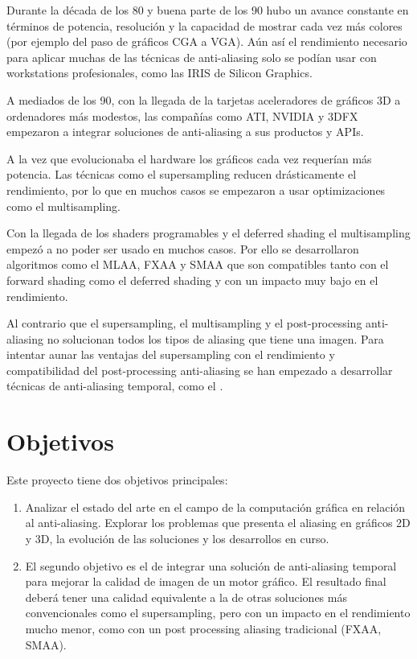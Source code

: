 \documentclass[withindex, glossary]{cam-thesis}
\begin{document}
Durante la década de los 80 y buena parte de los 90 hubo un avance constante en términos de potencia, resolución y la capacidad de mostrar cada vez más colores (por ejemplo del paso de gráficos CGA a VGA). Aún así el rendimiento necesario para aplicar muchas de las técnicas de anti-aliasing solo se podían usar con workstations profesionales, como las IRIS de Silicon Graphics.

A mediados de los 90, con la llegada de la tarjetas aceleradores de gráficos 3D a ordenadores más modestos, las compañías como ATI, NVIDIA y 3DFX empezaron a integrar soluciones de anti-aliasing a sus productos y APIs.

A la vez que evolucionaba el hardware los gráficos cada vez requerían más potencia. Las técnicas como el supersampling reducen drásticamente el rendimiento, por lo que en muchos casos se empezaron a usar optimizaciones como el multisampling.

Con la llegada de los shaders programables y el deferred shading el multisampling empezó a no poder ser usado en muchos casos. Por ello se desarrollaron algoritmos como el MLAA, FXAA y SMAA que son compatibles tanto con el forward shading como el deferred shading y con un impacto muy bajo en el rendimiento.

Al contrario que el supersampling, el multisampling y el post-processing anti-aliasing no solucionan todos los tipos de aliasing que tiene una imagen. Para intentar aunar las ventajas del supersampling con el rendimiento y compatibilidad del post-processing anti-aliasing se han empezado a desarrollar técnicas de anti-aliasing temporal, como el \@.

\chapter{Objetivos}

Este proyecto tiene dos objetivos principales:

\begin{enumerate}
    \item Analizar el estado del arte en el campo de la computación gráfica en relación al anti-aliasing. Explorar los problemas que presenta el aliasing en gráficos 2D y 3D, la evolución de las soluciones y los desarrollos en curso.
    \item El segundo objetivo es el de integrar una solución de anti-aliasing temporal para mejorar la calidad de imagen de un motor gráfico. El resultado final deberá tener una calidad equivalente a la de otras soluciones más convencionales como el supersampling, pero con un impacto en el rendimiento mucho menor, como con un post processing aliasing tradicional (FXAA, SMAA).
\end{enumerate}
\end{document}
